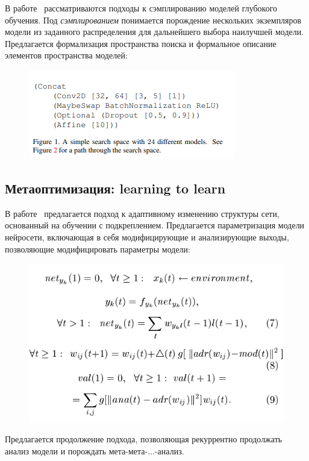 В работе~\cite{search_space} рассматриваются подходы к сэмплированию моделей глубокого обучения. Под \textit{сэмплированием} понимается порождение нескольких экземпляров модели из заданного распределения для дальнейшего выбора наилучшей модели. Предлагается формализация пространства поиска и формальное описание элементов  пространства моделей:
 \begin{figure}[H]
\includegraphics[width=\textwidth]{./arch_review_figs/search_space.png}
\end{figure}

\subsection{Метаоптимизация: learning to learn}
В работе~\cite{self_rnn} предлагается подход к адаптивному изменению структуры сети, основанный на обучении с подкреплением. Предлагается параметризация модели нейросети, включающая в себя модифицирующие и анализирующие выходы, позволяющие модифицировать параметры модели:
\begin{figure}[H]
\includegraphics[width=\textwidth]{./arch_review_figs/self_rnn.png}
\end{figure}
Предлагается продолжение подхода, позволяющая рекуррентно продолжать анализ модели и порождать мета-мета-$\dots$-анализ.

